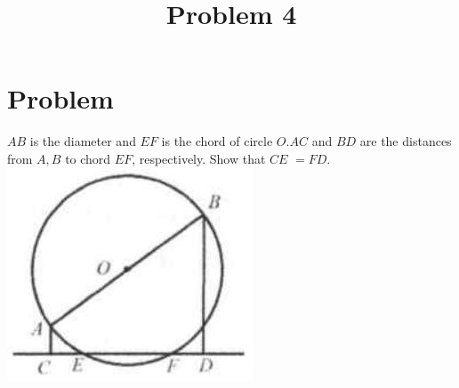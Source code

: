 \documentclass{article}
\title{Problem 4}
\date{}
\begin{document}
\maketitle

\section*{Problem}
\(A B\) is the diameter and \(E F\) is the chord of circle \(O . A C\) and \(B D\) are the distances from \(A, B\) to chord \(E F\), respectively. Show that \(C E\) \(=F D\).\\
\centering
\includegraphics[width=\textwidth]{images/problem_image_1.jpg}
\end{document}
